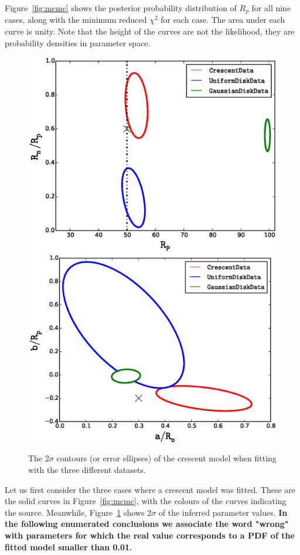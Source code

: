 Figure~\ref{fig:mcmc} shows the posterior probability distribution of
$R_p$ for all nine cases, along with the minimum reduced $\chi^2$ for
each case.  The area under each curve is unity. Note that the height
of the curves are not the likelihood, they are probability densities
in parameter space.

\begin{figure}
\centering
  \includegraphics[width=0.9\hsize,bb=0 0 576 432
                  ]{plots/Rhalf_RnRp.eps}
  \includegraphics[width=0.9\hsize,bb=0 0 576 432
                  ]{plots/aRp_bRp.eps}
\caption{\label{fig:crescentfit} The 2$\sigma$ contours (or error ellipses)
  of the crescent model when fitting with the three different
  datasets.}
\end{figure}

Let us first consider the three cases where a crescent model was
fitted.  These are the solid curves in Figure~\ref{fig:mcmc}, with the
colours of the curves indicating the source.  Meanwhile,
Figure~\ref{fig:crescentfit} shows $2\sigma$ of the inferred parameter
values. \textbf{In the following enumerated conclusions we associate the word "wrong"
with parameters for which the real value corresponds to a PDF of the fitted model smaller than 
0.01. }

